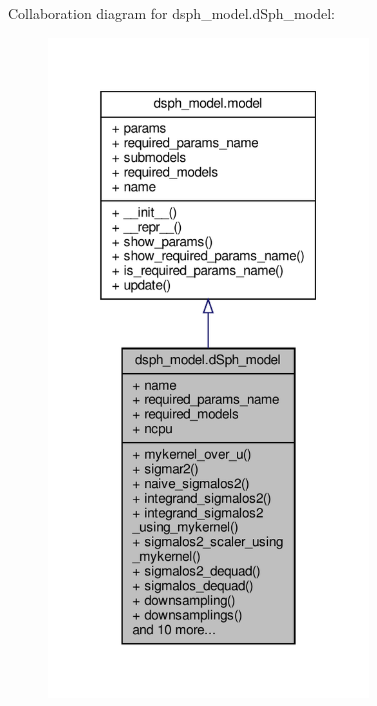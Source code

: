 Collaboration diagram for dsph\+\_\+model.\+d\+Sph\+\_\+model\+:\nopagebreak
\begin{figure}[H]
\begin{center}
\leavevmode
\includegraphics[width=241pt]{d6/d29/classdsph__model_1_1dSph__model__coll__graph}
\end{center}
\end{figure}
